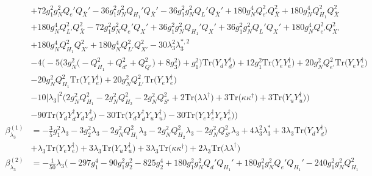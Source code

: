 {\begin{align}
 &+72 g_{1}^{2} g_{N}^{2} Q_e' Q_{\bar{X}}' -36 g_{1}^{2} g_{N}^{2} Q_{H_1}' Q_{\bar{X}}' -36 g_{1}^{2} g_{N}^{2} Q_L' Q_{\bar{X}}' +180 g_{N}^{4} Q_{e'}^{2} Q_{\bar{X}}^{2} +180 g_{N}^{4} Q_{H_1}^{2} Q_{\bar{X}}^{2} \nonumber \\ 
 &+180 g_{N}^{4} Q_{L'}^{2} Q_{\bar{X}}^{2} -72 g_{1}^{2} g_{N}^{2} Q_e' Q_X' +36 g_{1}^{2} g_{N}^{2} Q_{H_1}' Q_X' +36 g_{1}^{2} g_{N}^{2} Q_L' Q_X' +180 g_{N}^{4} Q_{e'}^{2} Q_{X'}^{2} \nonumber \\ 
 &+180 g_{N}^{4} Q_{H_1}^{2} Q_{X'}^{2} +180 g_{N}^{4} Q_{L'}^{2} Q_{X'}^{2} -30 \lambda_{3}^{2} \lambda_{3}^{*,2} \nonumber \\ 
 &-4 \Big(-5 \Big(3 g_{N}^{2} \Big(- Q_{H_1}^{2}  + Q_{d'}^{2} + Q_{Q'}^{2}\Big) + 8 g_{3}^{2} \Big) + g_{1}^{2}\Big)\mbox{Tr}\Big({Y_d  Y_{d}^{\dagger}}\Big) +12 g_{1}^{2} \mbox{Tr}\Big({Y_e  Y_{e}^{\dagger}}\Big) +20 g_{N}^{2} Q_{e'}^{2} \mbox{Tr}\Big({Y_e  Y_{e}^{\dagger}}\Big) \nonumber \\ 
 &-20 g_{N}^{2} Q_{H_1}^{2} \mbox{Tr}\Big({Y_e  Y_{e}^{\dagger}}\Big) +20 g_{N}^{2} Q_{L'}^{2} \mbox{Tr}\Big({Y_e  Y_{e}^{\dagger}}\Big) \nonumber \\ 
 &-10 |\lambda_3|^2 \Big(2 g_{N}^{2} Q_{H_1}^{2}  -2 g_{N}^{2} Q_{H_2}^{2}  -2 g_{N}^{2} Q_{S'}^{2}  + 2 \mbox{Tr}\Big({\lambda  \lambda^{\dagger}}\Big)  + 3 \mbox{Tr}\Big({\kappa  \kappa^{\dagger}}\Big)  + 3 \mbox{Tr}\Big({Y_u  Y_{u}^{\dagger}}\Big) \Big)\nonumber \\ 
 &-90 \mbox{Tr}\Big({Y_d  Y_{d}^{\dagger}  Y_d  Y_{d}^{\dagger}}\Big) -30 \mbox{Tr}\Big({Y_d  Y_{d}^{\dagger}  Y_u  Y_{u}^{\dagger}}\Big) -30 \mbox{Tr}\Big({Y_e  Y_{e}^{\dagger}  Y_e  Y_{e}^{\dagger}}\Big) \Big)\\ 
\beta_{\lambda_3}^{(1)} & =  
-\frac{3}{5} g_{1}^{2} \lambda_3 -3 g_{2}^{2} \lambda_3 -2 g_{N}^{2} Q_{H_1}^{2} \lambda_3 -2 g_{N}^{2} Q_{H_2}^{2} \lambda_3 -2 g_{N}^{2} Q_{S'}^{2} \lambda_3 +4 \lambda_{3}^{2} \lambda_3^* +3 \lambda_3 \mbox{Tr}\Big({Y_d  Y_{d}^{\dagger}}\Big) \nonumber \\ 
 &+\lambda_3 \mbox{Tr}\Big({Y_e  Y_{e}^{\dagger}}\Big) +3 \lambda_3 \mbox{Tr}\Big({Y_u  Y_{u}^{\dagger}}\Big) +3 \lambda_3 \mbox{Tr}\Big({\kappa  \kappa^{\dagger}}\Big) +2 \lambda_3 \mbox{Tr}\Big({\lambda  \lambda^{\dagger}}\Big) \\ 
\beta_{\lambda_3}^{(2)} & =  
-\frac{1}{50} \lambda_3 \Big(-297 g_{1}^{4} -90 g_{1}^{2} g_{2}^{2} -825 g_{2}^{4} +180 g_{1}^{2} g_{N}^{2} Q_d' Q_{H_1}' +180 g_{1}^{2} g_{N}^{2} Q_e' Q_{H_1}' -240 g_{1}^{2} g_{N}^{2} Q_{H_1}^{2} \nonumber \\ 

\end{align}}
